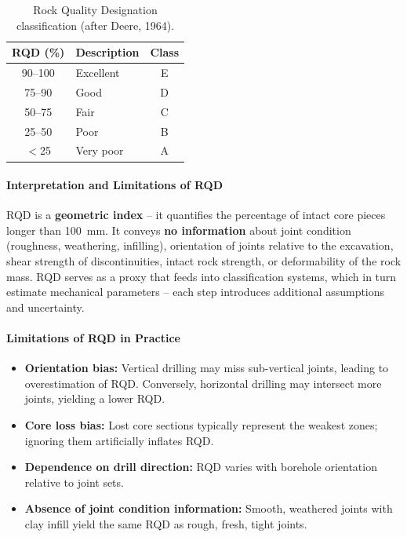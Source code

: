 \begin{table}[h!]
\centering
\begin{tabular}{clc}
\toprule
\textbf{RQD (\%)} & \textbf{Description} & \textbf{Class} \\
\midrule
90--100 & Excellent & E \\
75--90 & Good & D \\
50--75 & Fair & C \\
25--50 & Poor & B \\
$<$25 & Very poor & A \\
\bottomrule
\end{tabular}
\caption{Rock Quality Designation classification (after Deere, 1964).}
\label{tab:rqd}
\end{table}

\paragraph{Interpretation and Limitations of RQD}

\begin{warnbox}
RQD is a \textbf{geometric index} -- it quantifies the percentage of intact core pieces longer than 100~mm. It conveys \textbf{no information} about joint condition (roughness, weathering, infilling), orientation of joints relative to the excavation, shear strength of discontinuities, intact rock strength, or deformability of the rock mass. RQD serves as a proxy that feeds into classification systems, which in turn estimate mechanical parameters -- each step introduces additional assumptions and uncertainty.
\end{warnbox}

\paragraph{Limitations of RQD in Practice}
\begin{itemize}
 \item \textbf{Orientation bias:} Vertical drilling may miss sub-vertical joints, leading to overestimation of RQD. Conversely, horizontal drilling may intersect more joints, yielding a lower RQD.
 \item \textbf{Core loss bias:} Lost core sections typically represent the weakest zones; ignoring them artificially inflates RQD.
 \item \textbf{Dependence on drill direction:} RQD varies with borehole orientation relative to joint sets.
 \item \textbf{Absence of joint condition information:} Smooth, weathered joints with clay infill yield the same RQD as rough, fresh, tight joints.
\end{itemize}

